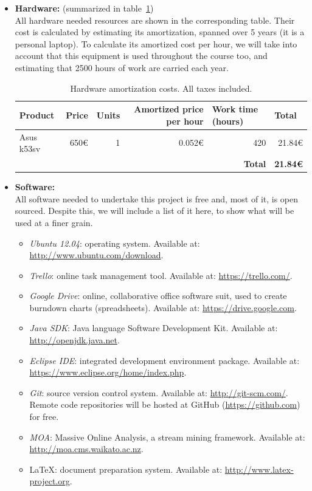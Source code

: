 \begin{itemize}
	\item \textbf{Hardware:} (summarized in table~\ref{table:hardware-resources})\\
	All hardware needed resources are shown in the corresponding table. Their cost is calculated by estimating its amortization, spanned over 5 years (it is a personal laptop). To calculate its amortized cost per hour, we will take into account that this equipment is used throughout the course too, and estimating that 2500 hours of work are carried each year.
	\begin{table}[h]
	\centering
	\begin{tabular}{l r r r r r}
	\hline
	\textbf{Product} & \multicolumn{1}{l}{\textbf{Price}} & \multicolumn{1}{l}{\textbf{Units}} & \multicolumn{1}{p{3cm}}{\textbf{Amortized price per hour}} & \multicolumn{1}{l}{\textbf{Work time (hours)}} & \multicolumn{1}{l}{\textbf{Total}} \\ \hline
	Asus k53sv & 650€ & 1 & 0.052€ & 420 & 21.84€ \\ \hline
	 &  &  &  & \textbf{Total} & \textbf{21.84€}
	\end{tabular}
	\caption{Hardware amortization costs. All taxes included.}
	\label{table:hardware-resources}
	\end{table}
	
	\item \textbf{Software:}\\
	All software needed to undertake this project is free and, most of it, is open sourced. Despite this, we will include a list of it here, to show what will be used at a finer grain.
	\begin{itemize}
		\item \textit{Ubuntu 12.04}: operating system. Available at: \url{http://www.ubuntu.com/download}.
		\item \textit{Trello}: online task management tool. Available at: \url{https://trello.com/}.
		\item \textit{Google Drive}: online, collaborative office software suit, used to create burndown charts (spreadsheets). Available at: \url{https://drive.google.com}.
		\item \textit{Java SDK}: Java language Software Development Kit. Available at: \url{http://openjdk.java.net}.
		\item \textit{Eclipse IDE}: integrated development environment package. Available at: \url{https://www.eclipse.org/home/index.php}.
		\item \textit{Git}: source version control system. Available at: \url{http://git-scm.com/}. Remote code repositories will be hosted at GitHub (\url{https://github.com}) for free.
		\item \textit{MOA}: Massive Online Analysis, a stream mining framework. Available at: \url{http://moa.cms.waikato.ac.nz}.
		\item \LaTeX: document preparation system. Available at: \url{http://www.latex-project.org}.
	\end{itemize}
	

\end{itemize}
